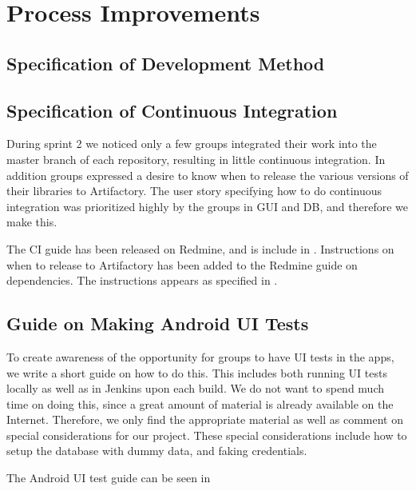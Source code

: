 \chapter{Process Improvements}
\dummy

\section{Specification of Development Method}
\dummy

\section{Specification of Continuous Integration}
During sprint 2 we noticed only a few groups integrated their work into the master branch of each repository, resulting in little continuous integration. In addition groups expressed a desire to know when to release the various versions of their libraries to Artifactory. The user story specifying how to do continuous integration was prioritized highly by the groups in GUI and DB, and therefore we make this.

The CI guide has been released on Redmine, and is include in . Instructions on when to release to Artifactory has been added to the Redmine guide on dependencies. The instructions appears as specified in .

\section{Guide on Making Android UI Tests}
To create awareness of the opportunity for groups to have UI tests in the apps, we write a short guide on how to do this. This includes both running UI tests locally as well as in Jenkins upon each build. We do not want to spend much time on doing this, since a great amount of material is already available on the Internet. Therefore, we only find the appropriate material as well as comment on special considerations for our project. These special considerations include how to setup the database with dummy data, and faking credentials.

The Android UI test guide can be seen in 